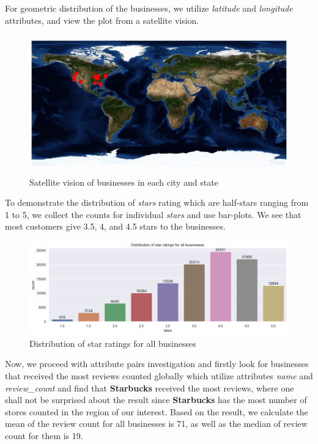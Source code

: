 \documentclass[runningheads]{llncs}
\begin{document}
For geometric distribution of the businesses, we utilize \textit{latitude} and \textit{longitude} attributes, and view the plot from a satellite vision. 

\begin{figure}[!h]
\centering
\includegraphics[height=6cm, width=12cm]{figs/latlongmap.png}
\caption{Satellite vision of businesses in each city and state}
\label{fig:latlongmap}
\end{figure}

To demonstrate the distribution of \textit{stars} rating which are half-stars ranging from 1 to 5, we collect the counts for individual \textit{stars} and use bar-plots. We see that most customers give 3.5, 4, and 4.5 stars to the businesses. 

\begin{figure}[!h]
\centering
\includegraphics[width=12cm]{figs/stars.png}
\caption{Distribution of star ratings for all businesses}
\label{fig:stars}
\end{figure}

Now, we proceed with attribute pairs investigation and firstly look for businesses that received the most reviews counted globally which utilize attributes \textit{name} and \textit{review\_count} and find that \textbf{Starbucks} received the most reviews, where one shall not be surprised about the result since \textbf{Starbucks} has the most number of stores counted in the region of our interest. Based on the result, we calculate the mean of the review count for all businesses is 71, as well as the median of review count for them is 19. 
\end{document}
